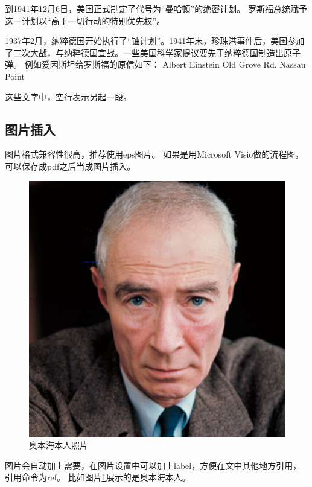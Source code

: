 \documentclass[a4paper, 10pt]{dselReport}
\begin{document}
到1941年12月6日，美国正式制定了代号为“曼哈顿”的绝密计划。 罗斯福总统赋予这一计划以“高于一切行动的特别优先权”。

1937年2月，纳粹德国开始执行了“铀计划”。1941年末，珍珠港事件后，美国参加了二次大战，与纳粹德国宣战。一些美国科学家提议要先于纳粹德国制造出原子弹。
例如爱因斯坦给罗斯福的原信如下：
Albert Einstein
Old Grove Rd.
Nassau Point

这些文字中，空行表示另起一段。



\subsection{图片插入}
图片格式兼容性很高，推荐使用eps图片。 如果是用Microsoft Visio做的流程图，可以保存成pdf之后当成图片插入。


\begin{figure}[ht!]
\centering
\includegraphics [scale=0.2,trim=0 0 0 0]{aobenhai.jpg}%
\caption{奥本海本人照片}%
\label{fig1}%
\end{figure}


图片会自动加上需要，在图片设置中可以加上label，方便在文中其他地方引用，引用命令为ref。 比如图片\ref{fig1}展示的是奥本海本人。
\end{document}
